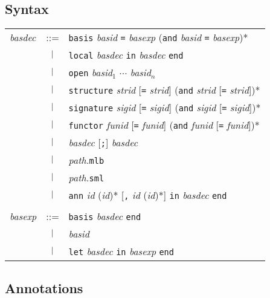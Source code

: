 %

%
\subsection{Syntax}

\begin{latexonly}
\begin{center}
\begin{tabular}{lcl}
{\it basdec} 
& ::=    & {\tt basis} {\it basid} {\tt =} {\it basexp}
            ({\tt and} {\it basid} {\tt =} {\it basexp})* \\
& $\ |\ $ & {\tt local} {\it basdec} {\tt in} {\it basdec} {\tt end} \\
& $\ |\ $ & {\tt open} {\it basid}$_1$ $\cdots$ {\it basid}$_n$ \\
& $\ |\ $ & {\tt structure} {\it strid} [{\tt =} {\it strid}] 
                ({\tt and} {\it strid} [{\tt =} {\it strid}])* \\
& $\ |\ $ & {\tt signature} {\it sigid} [{\tt =} {\it sigid}] 
                ({\tt and} {\it sigid} [{\tt =} {\it sigid}])* \\
& $\ |\ $ &   {\tt functor} {\it funid} [{\tt =} {\it funid}] 
                ({\tt and} {\it funid} [{\tt =} {\it funid}])* \\
& $\ |\ $ & {\it basdec} [{\tt;}] {\it basdec} \\
& $\ |\ $ & {\it path.}{\tt mlb} \\
& $\ |\ $ & {\it path.}{\tt sml} \\
& $\ |\ $ & {\tt ann} {\it id} ({\it id})* [{\tt ,}  {\it id} ({\it id})*] 
           {\tt in} {\it basdec} {\tt end} \\
\\
{\it basexp}
& ::=    & {\tt basis} {\it basdec} {\tt end} \\
& $\ |\ $ & {\it basid} \\
& $\ |\ $ & {\tt let} {\it basdec} {\tt in} {\it basexp} {\tt end}
\end{tabular}
\end{center}
\end{latexonly}
\begin{htmlonly}
\begin{center}
\begin{tabular{lcl}
\end{tabular{lcl}
\end{center}
\end{htmlonly}


%
\subsection{Annotations}

